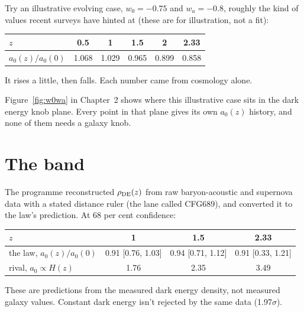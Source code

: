 Try an illustrative evolving case, $w_0=-0.75$ and $w_a=-0.8$, roughly the kind of values recent surveys have hinted at (these are for illustration, not a fit):
\begin{center}
\begin{tabular}{lccccc}
\toprule
$z$ & 0.5 & 1 & 1.5 & 2 & 2.33\\
\midrule
$a_0(z)/a_0(0)$ & 1.068 & 1.029 & 0.965 & 0.899 & 0.858\\
\bottomrule
\end{tabular}
\end{center}
It rises a little, then falls. Each number came from cosmology alone.

Figure~\ref{fig:w0wa} in Chapter~2 shows where this illustrative case sits in the dark energy knob plane. Every point in that plane gives its own $a_0(z)$ history, and none of them needs a galaxy knob.



\section{The band}

The programme reconstructed $\rho_{\rm DE}(z)$ from raw baryon-acoustic and supernova data with a stated distance ruler (the lane called CFG689), and converted it to the law's prediction. At 68 per cent confidence:
\begin{center}
\begin{tabular}{lccc}
\toprule
$z$ & 1 & 1.5 & 2.33\\
\midrule
the law, $a_0(z)/a_0(0)$ & 0.91 [0.76, 1.03] & 0.94 [0.71, 1.12] & 0.91 [0.33, 1.21]\\
rival, $a_0\propto H(z)$ & 1.76 & 2.35 & 3.49\\
\bottomrule
\end{tabular}
\end{center}
These are predictions from the measured dark energy density, not measured galaxy values. Constant dark energy isn't rejected by the same data (1.97$\sigma$).


